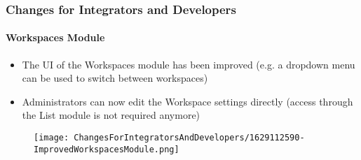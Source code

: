 %

\begin{frame}[fragile]
	\frametitle{Changes for Integrators and Developers}
	\framesubtitle{Workspaces Module}


	\begin{itemize}
		\item The UI of the Workspaces module has been improved\newline
			\small(e.g. a dropdown menu can be used to switch between workspaces)\normalsize
		\item Administrators can now edit the Workspace settings directly\newline
			\small(access through the List module is not required anymore)\normalsize
	\end{itemize}

	\begin{figure}
		\texttt{[image: ChangesForIntegratorsAndDevelopers/1629112590-ImprovedWorkspacesModule.png]}
	\end{figure}

\end{frame}

